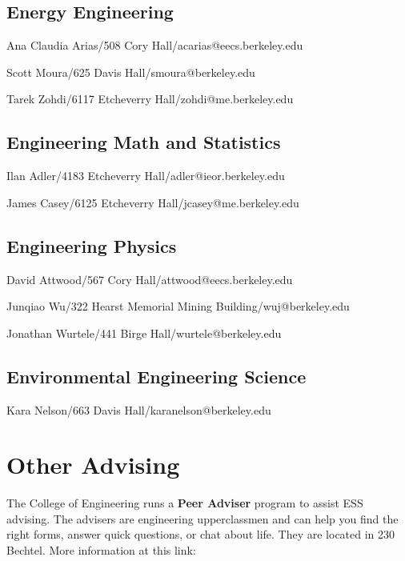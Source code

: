 \subsection*{Energy Engineering}

Ana Claudia Arias/508 Cory Hall/{\selectfont acarias@eecs.berkeley.edu}

Scott Moura/625 Davis Hall/{\selectfont smoura@berkeley.edu}

Tarek Zohdi/6117 Etcheverry Hall/{\selectfont zohdi@me.berkeley.edu}

\subsection*{Engineering Math and Statistics}

Ilan Adler/4183 Etcheverry Hall/{\selectfont adler@ieor.berkeley.edu}

James Casey/6125 Etcheverry Hall/{\selectfont jcasey@me.berkeley.edu}

\subsection*{Engineering Physics}

David Attwood/567 Cory Hall/{\selectfont attwood@eecs.berkeley.edu}

Junqiao Wu/322 Hearst Memorial Mining Building/{\selectfont wuj@berkeley.edu}

Jonathan Wurtele/441 Birge Hall/{\selectfont wurtele@berkeley.edu}

\subsection*{Environmental Engineering Science}

Kara Nelson/663 Davis Hall/{\selectfont karanelson@berkeley.edu}

\section*{Other Advising}

The College of Engineering runs a \textbf{Peer Adviser} program to assist ESS advising. The advisers are engineering upperclassmen and can help you find the right forms, answer quick questions, or chat about life. They are located in 230 Bechtel. More information at this link:

